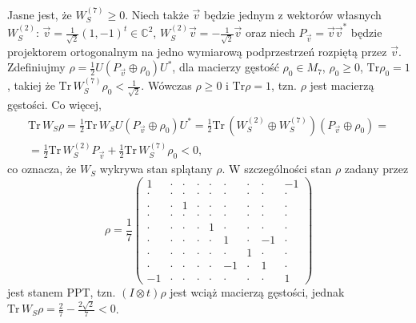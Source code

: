 Jasne jest, że $W_{S}^{(7)} \geq 0$.
Niech także  $\vec{v}$ będzie jednym z wektorów własnych $W_{S}^{(2)}$:
$\vec{v} = \frac{1}{\sqrt{2}} (1,-1)^{t} \in \mathbb{C}^{2}$,
$W_{S}^{(2)} \vec{v} = - \frac{1}{\sqrt{2}} \vec{v}$ oraz niech
$P_{\vec{v}} = \vec{v} \vec{v}^{*}$
będzie projektorem ortogonalnym na jedno wymiarową podprzestrzeń
rozpiętą przez $\vec{v}$.
Zdefiniujmy
$\rho = \frac{1}{2} U ( P_{\vec{v}} \oplus \rho_{0} ) U^{*}$,
dla macierzy gęstość $\rho_{0} \in M_{7}$,
$\rho_{0} \geq 0$, $\text{Tr} \rho_{0} = 1$,
takiej że
$\text{Tr}\, W_{S}^{(7)} \rho_{0} < \frac{1}{\sqrt{2}}$.
Wówczas $\rho \geq 0$ i $\text{Tr} \rho = 1$,
tzn. $\rho$ jest macierzą gęstości.
Co więcej,
\begin{multline}
\label{RandomLabel:851252}
    \text{Tr}\, W_{S} \rho =
\frac{1}{2} \text{Tr}\, W_{S} U (P_{\vec{v}} \oplus \rho_{0}) U^{*} =
\frac{1}{2} \text{Tr}\, (W_{S}^{(2)} \oplus W_{S}^{(7)}) (P_{\vec{v}} \oplus \rho_{0}) = \\ =
\frac{1}{2} \text{Tr}\, W_{S}^{(2)} P_{\vec{v}} + \frac{1}{2} \text{Tr}\, W_{S}^{(7)} \rho_{0}
< 0,
\end{multline}
co oznacza, że $W_{S}$ wykrywa stan splątany $\rho$.
W szczególności stan $\rho$ zadany przez
\begin{equation}
\label{PPTstate}
 \rho =  \frac{1}{7} \left( \begin{array}{ccc|ccc|ccc}
 1 &  \cdot& \cdot& \cdot& \cdot& \cdot& \cdot& \cdot& -1 \\
 \cdot& \cdot& \cdot& \cdot& \cdot& \cdot& \cdot& \cdot& \cdot\\
 \cdot& \cdot& 1 & \cdot& \cdot& \cdot& \cdot& \cdot& \cdot  \\ \hline
 \cdot& \cdot& \cdot& \cdot& \cdot& \cdot& \cdot& \cdot&  \cdot \\
 \cdot& \cdot& \cdot& \cdot& 1 & \cdot& \cdot& \cdot&  \cdot \\
 \cdot& \cdot& \cdot& \cdot& \cdot& 1 & \cdot & -1 & \cdot  \\ \hline
 \cdot& \cdot& \cdot & \cdot& \cdot& \cdot& 1& \cdot& \cdot  \\
 \cdot & \cdot& \cdot& \cdot& \cdot& -1 & \cdot& 1 & \cdot \\
 -1 & \cdot& \cdot& \cdot& \cdot & \cdot& \cdot& \cdot& 1
  \end{array} \right)
\end{equation}
jest stanem PPT, tzn. $(I \otimes t)\rho$ jest wciąż macierzą gęstości,
jednak $\text{Tr}\, W_{S} \rho = \frac{2}{7} - \frac{2\sqrt{2}}{7} < 0$.

